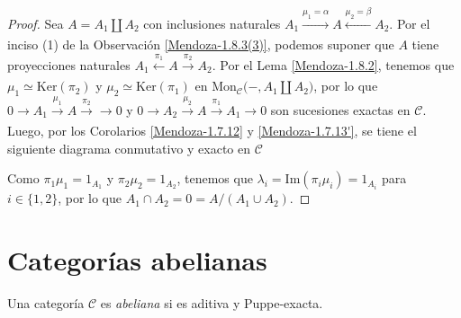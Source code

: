 \documentclass[tesis]{subfiles}
\begin{document}
\begin{proof}
    Sea $A=A_1\coprod A_2$ con inclusiones naturales $A_1\xrightarrow[]{\mu_1=\alpha}A \xleftarrow[]{\mu_2=\beta}A_2$. Por el inciso (1) de la Observación \ref{Mendoza-1.8.3(3)}, podemos suponer que $A$ tiene proyecciones naturales $A_1 \xleftarrow[]{\pi_1} A \xrightarrow[]{\pi_2} A_2$. Por el Lema \ref{Mendoza-1.8.2}, tenemos que $\mu_1\simeq\text{Ker}(\pi_2)$ y $\mu_2\simeq\text{Ker}(\pi_1)$ en $\text{Mon}_\mathscr{C}\big(-,A_1\coprod A_2\big)$, por lo que $0\to A_1\xrightarrow[]{\mu_1} A\xrightarrow[]{\pi_2}\to 0$ y $0\to A_2\xrightarrow[]{\mu_2} A\xrightarrow[]{\pi_1} A_1\to 0$ son sucesiones exactas en $\mathscr{C}$. Luego, por los Corolarios \ref{Mendoza-1.7.12} y \ref{Mendoza-1.7.13'}, se tiene el siguiente diagrama conmutativo y exacto en $\mathscr{C}$
    \begin{center}
    \end{center}
    Como $\pi_1\mu_1 = 1_{A_1}$ y $\pi_2\mu_2 = 1_{A_2}$, tenemos que $\lambda_i = \text{Im}(\pi_i\mu_i)=1_{A_i}$ para $i\in\{1,2\}$, por lo que $A_1\cap A_2 = 0 = A/(A_1\cup A_2)$.
\end{proof}

\section{Categorías abelianas} \label{Sec: Categorías abelianas}

\begin{Def}\label{Def: Categoría abeliana}
    Una categoría $\mathscr{C}$ es \emph{abeliana} si es aditiva y Puppe-exacta.
\end{Def}
\end{document}
